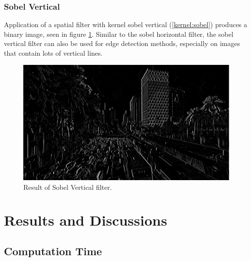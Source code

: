 \subsubsection{Sobel Vertical}

Application of a spatial filter with kernel sobel vertical (\ref{kernel:sobel}) produces a binary image, seen in figure \ref{fig:output-sobelver}. Similar to the sobel horizontal filter, the sobel vertical filter can also be used for edge detection methods, especially on images that contain lots of vertical lines.

\begin{figure}
    \includegraphics[width=0.8\linewidth, center]{images/output-image/input1-sobelver.png}
    \caption{Result of Sobel Vertical filter.}
    \label{fig:output-sobelver}
\end{figure}



\section{Results and Discussions}

\subsection{Computation Time}


